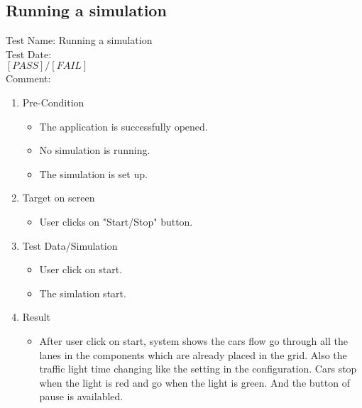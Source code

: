 \newpage 

\subsection{Running a simulation}
Test Name: Running a simulation\\Test Date: \\ $\left[ PASS \right] / \left[ FAIL \right]$\\Comment: \\
\begin{enumerate}
	\item Pre-Condition
	\begin{itemize}
		\item The application is successfully opened.
		\item No simulation is running.
		\item The simulation is set up.
	\end{itemize}
	\item Target on screen
	\begin{itemize}
		\item User clicks on "Start/Stop" button.
	\end{itemize}
	\item Test Data/Simulation
	\begin{itemize}
		\item User click on start.
		\item The simlation start.
	\end{itemize}
	\item Result
	\begin{itemize}
		\item After user click on start, system shows the cars flow go through all the lanes in the components which are already placed in the grid. Also the traffic light time changing like the setting in the configuration. 
		Cars stop when the light is red and go when the light is green. And the button of pause is availabled.
	\end{itemize}
\end{enumerate}

\newpage

